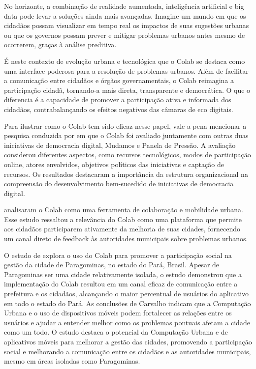 No horizonte, a combinação de realidade aumentada, inteligência artificial e big data pode levar a soluções ainda mais avançadas. Imagine um mundo em que os cidadãos possam visualizar em tempo real os impactos de suas sugestões urbanas ou que os governos possam prever e mitigar problemas urbanos antes mesmo de ocorrerem, graças à análise preditiva.

É neste contexto de evolução urbana e tecnológica que o Colab se destaca como uma interface poderosa para a resolução de problemas urbanos. Além de facilitar a comunicação entre cidadãos e órgãos governamentais, o Colab reimagina a participação cidadã, tornando-a mais direta, transparente e democrática. O que o diferencia é a capacidade de promover a participação ativa e informada dos cidadãos, contrabalançando os efeitos negativos das câmaras de eco digitais.

Para ilustrar como o Colab tem sido eficaz nesse papel, vale a pena mencionar a pesquisa conduzida por  em que o Colab foi avaliado juntamente com outras duas iniciativas de democracia digital, Mudamos e Panela de Pressão. A avaliação considerou diferentes aspectos, como recursos tecnológicos, modos de participação online, atores envolvidos, objetivos políticos das iniciativas e captação de recursos. Os resultados destacaram a importância da estrutura organizacional na compreensão do desenvolvimento bem-sucedido de iniciativas de democracia digital.

 analisaram o Colab como uma ferramenta de colaboração e mobilidade urbana. Esse estudo ressaltou a relevância do Colab como uma plataforma que permite aos cidadãos participarem ativamente da melhoria de suas cidades, fornecendo um canal direto de feedback às autoridades municipais sobre problemas urbanos.

O estudo de  explora o uso do Colab para promover a participação social na gestão da cidade de Paragominas, no estado do Pará, Brasil. Apesar de Paragominas ser uma cidade relativamente isolada, o estudo demonstrou que a implementação do Colab resultou em um canal eficaz de comunicação entre a prefeitura e os cidadãos, alcançando o maior percentual de usuários do aplicativo em todo o estado do Pará. As conclusões de Carvalho indicam que a Computação Urbana e o uso de dispositivos móveis podem fortalecer as relações entre os usuários e ajudar a entender melhor como os problemas pontuais afetam a cidade como um todo. O estudo destaca o potencial da Computação Urbana e de aplicativos móveis para melhorar a gestão das cidades, promovendo a participação social e melhorando a comunicação entre os cidadãos e as autoridades municipais, mesmo em áreas isoladas como Paragominas.

